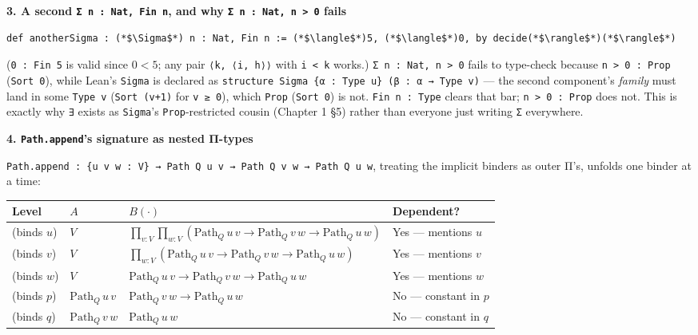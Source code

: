\textbf{3. A second \texttt{Σ n : Nat, Fin n}, and why \texttt{Σ n : Nat, n > 0} fails}

\begin{lstlisting}
def anotherSigma : (*$\Sigma$*) n : Nat, Fin n := (*$\langle$*)5, (*$\langle$*)0, by decide(*$\rangle$*)(*$\rangle$*)
\end{lstlisting}

(\texttt{0 : Fin 5} is valid since \(0 < 5\); any pair \texttt{⟨k, ⟨i, h⟩⟩} with \texttt{i < k} works.) \texttt{Σ n : Nat, n > 0} fails to type-check because \texttt{n > 0 : Prop} (\texttt{Sort 0}), while Lean's \texttt{Sigma} is declared as \texttt{structure Sigma \{α : Type u\} (β : α → Type v)} --- the second component's \emph{family} must land in some \texttt{Type v} (\texttt{Sort (v+1)} for \texttt{v ≥ 0}), which \texttt{Prop} (\texttt{Sort 0}) is not. \texttt{Fin n : Type} clears that bar; \texttt{n > 0 : Prop} does not. This is exactly why \texttt{∃} exists as \texttt{Sigma}'s \texttt{Prop}-restricted cousin (Chapter 1 §5) rather than everyone just writing \texttt{Σ} everywhere.

\textbf{4. \texttt{Path.append}'s signature as nested Π-types}

\texttt{Path.append : \{u v w : V\} → Path Q u v → Path Q v w → Path Q u w}, treating the implicit binders as outer Π's, unfolds one binder at a time:

{\small\begin{tabular}{
  >{\raggedright\arraybackslash}p{}
  >{\raggedright\arraybackslash}p{}
  >{\raggedright\arraybackslash}p{}
  >{\raggedright\arraybackslash}p{}
}
\toprule
Level & \(A\) & \(B(\cdot)\) & Dependent? \\
\midrule
1 (binds \(u\)) & \(V\) & \(\prod_{v:V}\prod_{w:V} (\mathrm{Path}_Q\,u\,v \to \mathrm{Path}_Q\,v\,w \to \mathrm{Path}_Q\,u\,w)\) & Yes --- mentions \(u\) \\
2 (binds \(v\)) & \(V\) & \(\prod_{w:V} (\mathrm{Path}_Q\,u\,v \to \mathrm{Path}_Q\,v\,w \to \mathrm{Path}_Q\,u\,w)\) & Yes --- mentions \(v\) \\
3 (binds \(w\)) & \(V\) & \(\mathrm{Path}_Q\,u\,v \to \mathrm{Path}_Q\,v\,w \to \mathrm{Path}_Q\,u\,w\) & Yes --- mentions \(w\) \\
4 (binds \(p\)) & \(\mathrm{Path}_Q\,u\,v\) & \(\mathrm{Path}_Q\,v\,w \to \mathrm{Path}_Q\,u\,w\) & No --- constant in \(p\) \\
5 (binds \(q\)) & \(\mathrm{Path}_Q\,v\,w\) & \(\mathrm{Path}_Q\,u\,w\) & No --- constant in \(q\) \\
\bottomrule
\end{tabular}}


